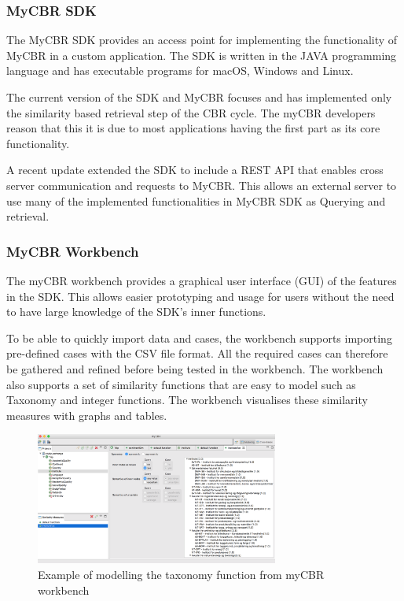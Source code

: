 \subsubsection{MyCBR SDK}
The MyCBR SDK provides an access point for implementing the functionality of MyCBR in a custom application. The SDK is written in the JAVA programming language and has executable programs for macOS, Windows and Linux\cite{MyCBR}. 

The current version of the SDK and MyCBR focuses and has implemented only the similarity based retrieval step of the CBR cycle. The myCBR developers reason that this it is due to most applications having the first part as its core functionality\cite{Stahl2008}.  

A recent update extended the SDK to include a REST API that enables cross server communication and requests to MyCBR. This allows an external server to use many of the implemented functionalities in MyCBR SDK as Querying and retrieval.

\subsubsection{MyCBR Workbench}

The myCBR workbench provides a graphical user interface (GUI) of the features in the SDK. This allows easier prototyping and usage for users without the need to have large knowledge of the SDK's inner functions\cite{bach2014knowledge}. 

To be able to quickly import data and cases, the workbench supports importing pre-defined cases with the CSV file format. All the required cases can therefore be gathered and refined before being tested in the workbench. The workbench also supports a set of similarity functions that are easy to model such as Taxonomy and integer functions. The workbench visualises these similarity measures with graphs and tables.

\begin{figure}[H]
    \centering
    \includegraphics[width=8cm]{fig/myCBRworkbench.png}
    \caption{Example of modelling the taxonomy function from myCBR workbench}
\end{figure}




